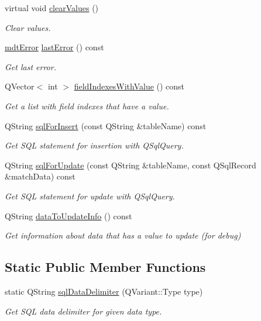 \begin{DoxyCompactItemize}
virtual void \hyperlink{classmdt_sql_record_a0bfc0fc265c6b0048698e2f5d4f840a8}{clear\-Values} ()
\begin{DoxyCompactList}\small\item\em Clear values. \end{DoxyCompactList}\item 
\hyperlink{classmdt_error}{mdt\-Error} \hyperlink{classmdt_sql_record_aa997bbc32402c3a254404ab74b9662f0}{last\-Error} () const 
\begin{DoxyCompactList}\small\item\em Get last error. \end{DoxyCompactList}\item 
Q\-Vector$<$ int $>$ \hyperlink{classmdt_sql_record_a7be0d16ddc4651194ab12090065b2c1e}{field\-Indexes\-With\-Value} () const 
\begin{DoxyCompactList}\small\item\em Get a list with field indexes that have a value. \end{DoxyCompactList}\item 
Q\-String \hyperlink{classmdt_sql_record_a20396c886d184d0ae176f8dea72d971b}{sql\-For\-Insert} (const Q\-String \&table\-Name) const 
\begin{DoxyCompactList}\small\item\em Get S\-Q\-L statement for insertion with Q\-Sql\-Query. \end{DoxyCompactList}\item 
Q\-String \hyperlink{classmdt_sql_record_a2ded0365b7ec9c94607bb6d8a5c16c98}{sql\-For\-Update} (const Q\-String \&table\-Name, const Q\-Sql\-Record \&match\-Data) const 
\begin{DoxyCompactList}\small\item\em Get S\-Q\-L statement for update with Q\-Sql\-Query. \end{DoxyCompactList}\item 
Q\-String \hyperlink{classmdt_sql_record_a00c49b329d7170a8f840d7921f9b0f07}{data\-To\-Update\-Info} () const 
\begin{DoxyCompactList}\small\item\em Get information about data that has a value to update (for debug) \end{DoxyCompactList}\end{DoxyCompactItemize}
\subsection*{Static Public Member Functions}
\begin{DoxyCompactItemize}
\item 
static Q\-String \hyperlink{classmdt_sql_record_a1bc8d0787c3aa941afcf444d661c07db}{sql\-Data\-Delimiter} (Q\-Variant\-::\-Type type)
\begin{DoxyCompactList}\small\item\em Get S\-Q\-L data delimiter for given data type. \end{DoxyCompactList}\end{DoxyCompactItemize}
